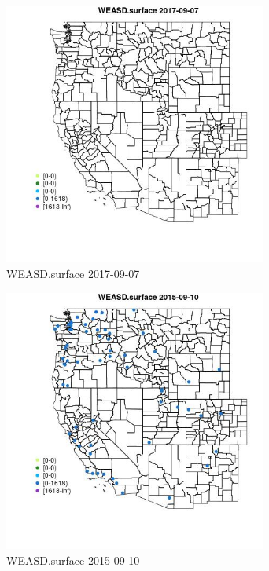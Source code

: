 \begin{figure} 
\centering  
\includegraphics[width=0.77\textwidth]{Code_Outputs/Report_ML_input_PM25_Step4_part_e_de_duplicated_aveswNAs_MapObsWEASDsurface2017-09-07.jpg} 
\caption{\label{fig:Report_ML_input_PM25_Step4_part_e_de_duplicated_aveswNAsMapObsWEASDsurface2017-09-07}WEASD.surface 2017-09-07} 
\end{figure} 
 

\clearpage 

\begin{figure} 
\centering  
\includegraphics[width=0.77\textwidth]{Code_Outputs/Report_ML_input_PM25_Step4_part_e_de_duplicated_aveswNAs_MapObsWEASDsurface2015-09-10.jpg} 
\caption{\label{fig:Report_ML_input_PM25_Step4_part_e_de_duplicated_aveswNAsMapObsWEASDsurface2015-09-10}WEASD.surface 2015-09-10} 
\end{figure} 
 

